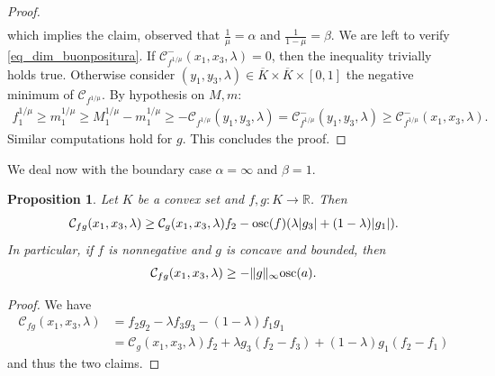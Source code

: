 \documentclass[11pt, reqno]{amsart}
\newtheorem{proposition}[lemma]{Proposition}
\theoremstyle{definition}
\numberwithin{equation}{section}
\newcommand{\R}{\mathbb{R}}
\newcommand{\mc}[1]{\mathcal{#1}}
\newcommand{\osc}{{\rm osc}}
\def\norm#1{\|#1\|}
\begin{document}
\begin{proof}
\begin{align*}
\end{align*}
which implies
 the claim, observed that $\frac{1}{\mu}=\alpha$ and $\frac{1}{1-\mu}=\beta$. 
We are left to verify \eqref{eq_dim_buonpositura}.
If $\mathcal{C}^-_{f^{1/\mu}}(x_1,x_3,\lambda)=0$, then the inequality trivially holds true. Otherwise consider $(y_1,y_3,\lambda)\in \overline{K}\times \overline{K}\times [0,1]$ the negative minimum of $\mathcal{C}_{f^{1/\mu}}$. By hypothesis on $M,m$: 
\begin{align*}
f^{1/\mu}_1\geq m_1^{1/\mu}\geq M_1^{1/\mu}-m_1^{1/\mu}\geq -\mathcal{C}_{f^{1/\mu}}(y_1,y_3,\lambda)=\mathcal{C}^-_{f^{1/\mu}}(y_1,y_3,\lambda)\geq \mathcal{C}^-_{f^{1/\mu}}(x_1,x_3,\lambda).
\end{align*}
Similar computations hold for $g$. 
This concludes the proof.
 \end{proof}

We deal now with the boundary case $\alpha=\infty$ and $\beta = 1$.

\begin{proposition}\label{prop_extram_cases}
Let $K$ be a convex set and $f,g\colon K \to \R$. Then
$$\mc{C}_{fg}(x_1, x_3, \lambda) \geq \mc{C}_g (x_1, x_3, \lambda) f_2 - \osc(f) (\lambda |g_3| + (1-\lambda) |g_1|).$$
In particular, if $f$ is nonnegative and $g$ is concave and bounded, then 
$$\mc{C}_{fg}(x_1,x_3,\lambda) \geq - \norm{g}_{\infty} \osc(a).$$
\end{proposition}

\begin{proof}
 We have
\begin{align*}
\mc{C}_{fg}(x_1,x_3,\lambda) &= f_2 g_2 - \lambda f_3 g_3 - (1-\lambda) f_1g _1 \\
& = \mc{C}_g(x_1, x_3, \lambda) f_2 + \lambda g_3 (f_2-f_3) + (1-\lambda) g_1 (f_2-f_1)
\end{align*}
and thus the two claims.
\end{proof}
\end{document}

